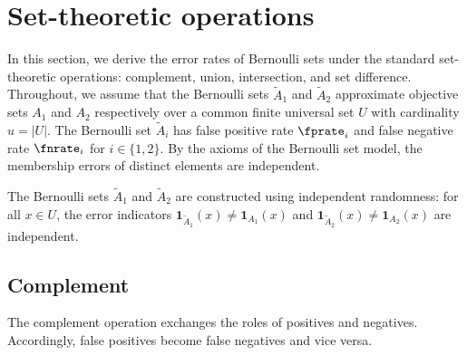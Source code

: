 
\section{Set-theoretic operations}
\label{sec:set_theory}
In this section, we derive the error rates of Bernoulli sets under the
standard set-theoretic operations: complement, union, intersection, and set
difference.
Throughout, we assume that the Bernoulli sets $\tilde{A}_1$ and
$\tilde{A}_2$ approximate objective sets $A_1$ and $A_2$ respectively over
a common finite universal set $U$ with cardinality $u = |U|$.
The Bernoulli set $\tilde{A}_i$ has false positive rate $\fprate_i$ and
false negative rate $\fnrate_i$ for $i \in \{1,2\}$.
By the axioms of the Bernoulli set model, the membership errors of distinct
elements are independent.

\begin{assumption}
\label{asm:cross_set_indep}
The Bernoulli sets $\tilde{A}_1$ and $\tilde{A}_2$ are constructed using independent randomness: for all $x \in U$, the error indicators $\mathbf{1}_{\tilde{A}_1}(x) \neq \mathbf{1}_{A_1}(x)$ and $\mathbf{1}_{\tilde{A}_2}(x) \neq \mathbf{1}_{A_2}(x)$ are independent.
\end{assumption}

\subsection{Complement}
\label{sec:complement}
The complement operation exchanges the roles of positives and negatives.
Accordingly, false positives become false negatives and vice versa.

